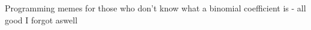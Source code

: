 \documentclass[../lecture4-functions.tex]{subfiles}
\begin{document}

\begin{frame}[fragile]{Programming memes for those who don't know what a binomial coefficient is - all good I forgot aswell}
    \begin{center}
    \end{center}
\end{frame}

\end{document}
